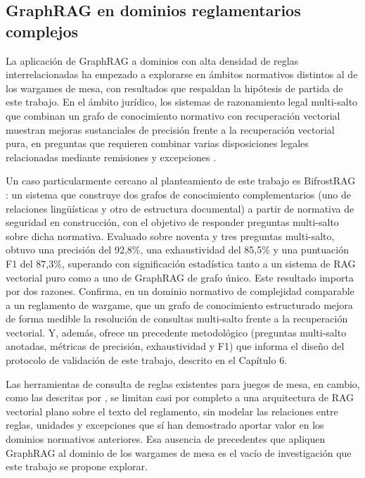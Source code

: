 \documentclass[11pt,a4paper,spanish]{book}
\numberwithin{equation}{chapter}
\numberwithin{figure}{chapter}
\numberwithin{table}{chapter}
\begin{document}
\subsection{GraphRAG en dominios reglamentarios complejos}

La aplicación de GraphRAG a dominios con alta densidad de reglas interrelacionadas ha empezado a explorarse en ámbitos normativos distintos al de los wargames de mesa, con resultados que respaldan la hipótesis de partida de este trabajo. En el ámbito jurídico, los sistemas de razonamiento legal multi-salto que combinan un grafo de conocimiento normativo con recuperación vectorial muestran mejoras sustanciales de precisión frente a la recuperación vectorial pura, en preguntas que requieren combinar varias disposiciones legales relacionadas mediante remisiones y excepciones \cite{legalgraphrag2026}.

Un caso particularmente cercano al planteamiento de este trabajo es BifrostRAG \cite{bifrostrag2025}: un sistema que construye dos grafos de conocimiento complementarios (uno de relaciones lingüísticas y otro de estructura documental) a partir de normativa de seguridad en construcción, con el objetivo de responder preguntas multi-salto sobre dicha normativa. Evaluado sobre noventa y tres preguntas multi-salto, obtuvo una precisión del 92,8\%, una exhaustividad del 85,5\% y una puntuación F1 del 87,3\%, superando con significación estadística tanto a un sistema de RAG vectorial puro como a uno de GraphRAG de grafo único. Este resultado importa por dos razones. Confirma, en un dominio normativo de complejidad comparable a un reglamento de wargame, que un grafo de conocimiento estructurado mejora de forma medible la resolución de consultas multi-salto frente a la recuperación vectorial. Y, además, ofrece un precedente metodológico (preguntas multi-salto anotadas, métricas de precisión, exhaustividad y F1) que informa el diseño del protocolo de validación de este trabajo, descrito en el Capítulo 6.

Las herramientas de consulta de reglas existentes para juegos de mesa, en cambio, como las descritas por , se limitan casi por completo a una arquitectura de RAG vectorial plano sobre el texto del reglamento, sin modelar las relaciones entre reglas, unidades y excepciones que sí han demostrado aportar valor en los dominios normativos anteriores. Esa ausencia de precedentes que apliquen GraphRAG al dominio de los wargames de mesa es el vacío de investigación que este trabajo se propone explorar.
\end{document}
